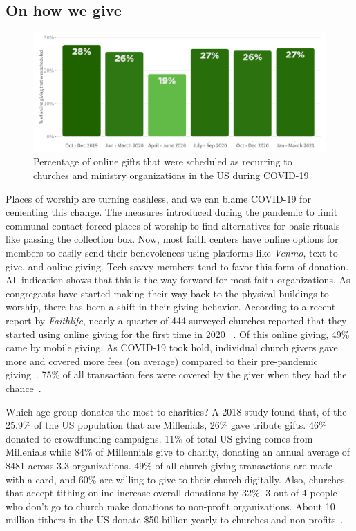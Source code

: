\subsection{On how we give}
\begin{figure}[t!]
\centering
\includegraphics[width=\columnwidth]{images/fig_9.PNG}
\caption{Percentage of online gifts that were scheduled as recurring to churches and ministry organizations in the US during COVID-19}
\label{fig5}
\end{figure}
Places of worship are turning cashless, and we can blame COVID-19 for cementing this change. The measures introduced during the pandemic to limit communal contact forced places of worship to find alternatives for basic rituals like passing the collection box. Now, most faith centers have online options for members to easily send their benevolences using platforms like \textit{Venmo}, text-to-give, and online giving. Tech-savvy members tend to favor this form of donation. All indication shows that this is the way forward for most faith organizations. As congregants have started making their way back to the physical buildings to worship, there has been a shift in their giving behavior. According to a recent report by \textit{Faithlife}, nearly a quarter of 444 surveyed churches reported that they started using online giving for the first time in 2020 ~\cite{jahng}. Of this online giving, 49\% came by mobile giving. As COVID-19 took hold, individual church givers gave more and covered more fees (on average) compared to their pre-pandemic giving~\cite{jahng}. 75\% of all transaction fees were covered by the giver when they had the chance~\cite{jahng}.

Which age group donates the most to charities? A 2018 study found that,  of the 25.9\% of the US population that are Millenials, 26\% gave tribute gifts. 46\% donated to crowdfunding campaigns. 11\% of total US giving comes from Millenials while 84\% of Millennials give to charity, donating an annual average of \$481 across 3.3 organizations. 49\% of all church-giving transactions are made with a card, and 60\% are willing to give to their church digitally. Also, churches that accept tithing online increase overall donations by 32\%. 3 out of 4 people who don’t go to church make donations to non-profit organizations. About 10 million tithers in the US donate \$50 billion yearly to churches and non-profits~\cite{Firch}.

